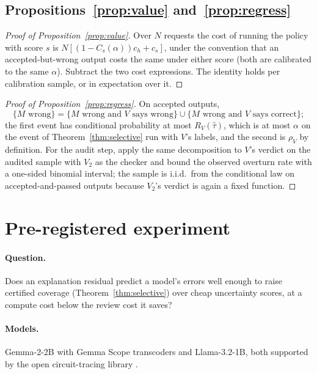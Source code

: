 \documentclass[11pt,letterpaper]{article}
\newcommand{\tauhat}{\hat{\tau}}
\theoremstyle{plain}
\theoremstyle{definition}
\theoremstyle{remark}
\begin{document}
\subsection{Propositions~\ref{prop:value} and~\ref{prop:regress}}
\begin{proof}[Proof of Proposition~\ref{prop:value}]
Over $N$ requests the cost of running the policy with score $s$ is $N[(1-C_s(\alpha))c_h+c_s]$, under the convention that an accepted-but-wrong output costs the same under either score (both are calibrated to the same $\alpha$). Subtract the two cost expressions. The identity holds per calibration sample, or in expectation over it.
\end{proof}

\begin{proof}[Proof of Proposition~\ref{prop:regress}]
On accepted outputs,
\[
\{M\text{ wrong}\}=\{M\text{ wrong and }V\text{ says wrong}\}\cup\{M\text{ wrong and }V\text{ says correct}\};
\]
the first event has conditional probability at most $R_V(\tauhat)$, which is at most $\alpha$ on the event of Theorem~\ref{thm:selective} run with $V$'s labels, and the second is $\rho_V$ by definition. For the audit step, apply the same decomposition to $V$'s verdict on the audited sample with $V_2$ as the checker and bound the observed overturn rate with a one-sided binomial interval; the sample is i.i.d.\ from the conditional law on accepted-and-passed outputs because $V_2$'s verdict is again a fixed function.
\end{proof}

\section{Pre-registered experiment}
\label{app:prereg}

\paragraph{Question.} Does an explanation residual predict a model's errors well enough to raise certified coverage (Theorem~\ref{thm:selective}) over cheap uncertainty scores, at a compute cost below the review cost it saves?

\paragraph{Models.} Gemma-2-2B with Gemma Scope transcoders \citep{lieberum2024gemmascope} and Llama-3.2-1B, both supported by the open circuit-tracing library \citep{anthropic2025opensource}.
\end{document}
